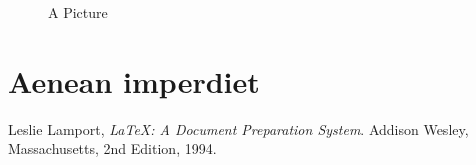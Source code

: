 \documentclass{template/openetcs_article}
\begin{document}
\lipsum[10]

\begin{figure}
  \centering
  \caption{A Picture}
  \label{fig:nola}
\end{figure}

\section{Aenean imperdiet}

\lipsum[11]

\nocite{*}






\begin{thebibliography}{9}

  Leslie Lamport,
  \emph{\LaTeX: A Document Preparation System}.
  Addison Wesley, Massachusetts,
  2nd Edition,
  1994.

\end{thebibliography}

\end{document}
